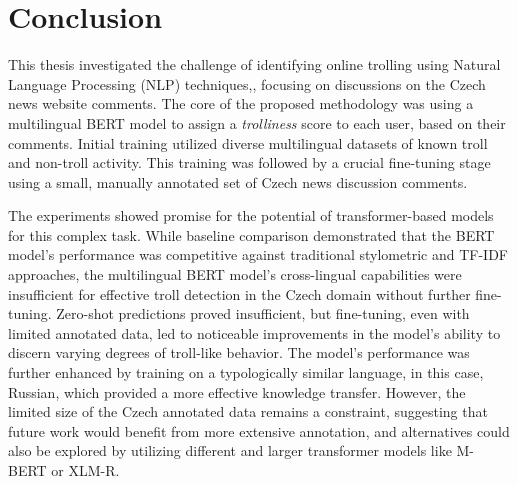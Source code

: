 \documentclass[twoside]{ctuthesis}
\theoremstyle{plain}
\theoremstyle{definition}
\theoremstyle{note}
\begin{document}
\chapter{Conclusion}

This thesis investigated the challenge of identifying online trolling using Natural Language Processing (NLP) techniques,, focusing on discussions on the Czech news website comments. The core of the proposed methodology was using a multilingual BERT model to assign a \textit{trolliness} score to each user, based on their comments. Initial training utilized diverse multilingual datasets of known troll and non-troll activity. This training was followed by a crucial fine-tuning stage using a small, manually annotated set of Czech news discussion comments.

The experiments showed promise for the potential of transformer-based models for this complex task. While baseline comparison demonstrated that the BERT model's performance was competitive against traditional stylometric and TF-IDF approaches, the multilingual BERT model's cross-lingual capabilities were insufficient for effective troll detection in the Czech domain without further fine-tuning. Zero-shot predictions proved insufficient, but fine-tuning, even with limited annotated data, led to noticeable improvements in the model's ability to discern varying degrees of troll-like behavior. The model's performance was further enhanced by training on a typologically similar language, in this case, Russian, which provided a more effective knowledge transfer. However, the limited size of the Czech annotated data remains a constraint, suggesting that future work would benefit from more extensive annotation, and alternatives could also be explored by utilizing different and larger transformer models like M-BERT or XLM-R.\par

\appendix

\printindex

 

\end{document}
